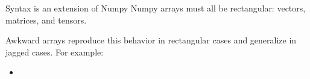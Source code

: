 \documentclass[aspectratio=169]{beamer}
\begin{document}





\begin{frame}{Syntax is an extension of Numpy}
\vspace{0.5 cm}
Numpy arrays must all be rectangular: vectors, matrices, and tensors.

\vspace{0.25 cm}
Awkward arrays reproduce this behavior in rectangular cases and generalize in jagged cases. For example:
\begin{itemize}
\item 



\end{itemize}
\end{frame}
\end{document}

